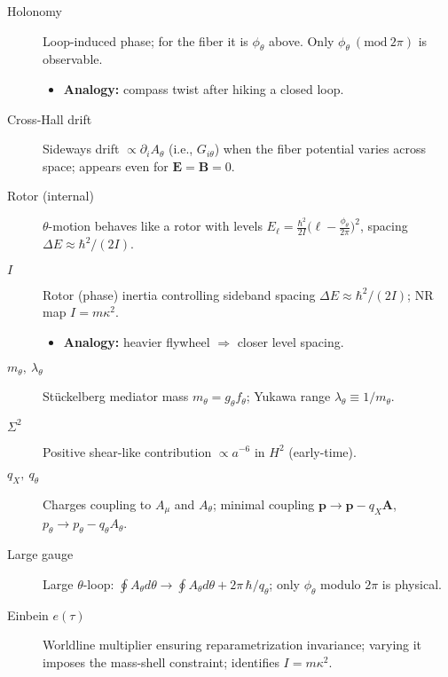 \begin{description}
  \item[Holonomy] Loop-induced phase; for the fiber it is $\phi_\theta$ above. Only $\phi_\theta\ (\mathrm{mod}\ 2\pi)$ is observable.
    \begin{itemize}
      \item \textbf{Analogy:} compass twist after hiking a closed loop.
    \end{itemize}
  \item[Cross-Hall drift] Sideways drift $\propto\partial_i A_\theta$ (i.e., $G_{i\theta}$) when the fiber potential varies across space; appears even for $\mathbf E=\mathbf B=0$.
  \item[Rotor (internal)] $\theta$-motion behaves like a rotor with levels
    $\displaystyle E_\ell=\frac{\hbar^2}{2I}\Big(\ell-\frac{\phi_\theta}{2\pi}\Big)^2$, spacing $\Delta E\approx \hbar^2/(2I)$.
  \item[$I$] Rotor (phase) inertia controlling sideband spacing $\Delta E\approx \hbar^2/(2I)$; NR map $I=m\kappa^2$.
    \begin{itemize}
      \item \textbf{Analogy:} heavier flywheel $\Rightarrow$ closer level spacing.
    \end{itemize}
  \item[$m_\theta,\ \lambda_\theta$] St\"uckelberg mediator mass $m_\theta=g_\theta f_\theta$; Yukawa range $\lambda_\theta\equiv 1/m_\theta$.
  \item[$\Sigma^2$] Positive shear-like contribution $\propto a^{-6}$ in $H^2$ (early-time).
  \item[$q_X,\ q_\theta$] Charges coupling to $A_\mu$ and $A_\theta$; minimal coupling $\mathbf p\to\mathbf p-q_X\mathbf A$, $p_\theta\to p_\theta-q_\theta A_\theta$.
  \item[Large gauge] Large $\theta$-loop: $\oint A_\theta d\theta\to \oint A_\theta d\theta+2\pi\,\hbar/q_\theta$; only $\phi_\theta$ modulo $2\pi$ is physical.
  \item[Einbein $e(\tau)$] Worldline multiplier ensuring reparametrization invariance; varying it imposes the mass-shell constraint; identifies $I=m\kappa^2$.
\end{description}
